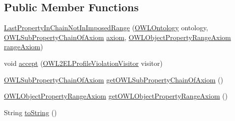 \subsection*{Public Member Functions}
\begin{DoxyCompactItemize}
\item 
\hyperlink{classorg_1_1semanticweb_1_1owlapi_1_1profiles_1_1_last_property_in_chain_not_in_imposed_range_afcbd6d82aa8f1a8db6fcac6af91a22f8}{Last\-Property\-In\-Chain\-Not\-In\-Imposed\-Range} (\hyperlink{interfaceorg_1_1semanticweb_1_1owlapi_1_1model_1_1_o_w_l_ontology}{O\-W\-L\-Ontology} ontology, \hyperlink{interfaceorg_1_1semanticweb_1_1owlapi_1_1model_1_1_o_w_l_sub_property_chain_of_axiom}{O\-W\-L\-Sub\-Property\-Chain\-Of\-Axiom} \hyperlink{classorg_1_1semanticweb_1_1owlapi_1_1profiles_1_1_last_property_in_chain_not_in_imposed_range_a111c0b3449dd5868fd68e55ca1378352}{axiom}, \hyperlink{interfaceorg_1_1semanticweb_1_1owlapi_1_1model_1_1_o_w_l_object_property_range_axiom}{O\-W\-L\-Object\-Property\-Range\-Axiom} \hyperlink{classorg_1_1semanticweb_1_1owlapi_1_1profiles_1_1_last_property_in_chain_not_in_imposed_range_a950663ea9305a01b3518d6cd85851512}{range\-Axiom})
\item 
void \hyperlink{classorg_1_1semanticweb_1_1owlapi_1_1profiles_1_1_last_property_in_chain_not_in_imposed_range_a0589795148c909d91e1b8cb9fca037f7}{accept} (\hyperlink{interfaceorg_1_1semanticweb_1_1owlapi_1_1profiles_1_1_o_w_l2_e_l_profile_violation_visitor}{O\-W\-L2\-E\-L\-Profile\-Violation\-Visitor} visitor)
\item 
\hyperlink{interfaceorg_1_1semanticweb_1_1owlapi_1_1model_1_1_o_w_l_sub_property_chain_of_axiom}{O\-W\-L\-Sub\-Property\-Chain\-Of\-Axiom} \hyperlink{classorg_1_1semanticweb_1_1owlapi_1_1profiles_1_1_last_property_in_chain_not_in_imposed_range_a42a1d8dd30e637c39dc907c94ca09503}{get\-O\-W\-L\-Sub\-Property\-Chain\-Of\-Axiom} ()
\item 
\hyperlink{interfaceorg_1_1semanticweb_1_1owlapi_1_1model_1_1_o_w_l_object_property_range_axiom}{O\-W\-L\-Object\-Property\-Range\-Axiom} \hyperlink{classorg_1_1semanticweb_1_1owlapi_1_1profiles_1_1_last_property_in_chain_not_in_imposed_range_a5014f740d3c8244fe740b1b1a09cb733}{get\-O\-W\-L\-Object\-Property\-Range\-Axiom} ()
\item 
String \hyperlink{classorg_1_1semanticweb_1_1owlapi_1_1profiles_1_1_last_property_in_chain_not_in_imposed_range_a1c4fe4b1d7608ca3a0f3dd38a4798656}{to\-String} ()
\end{DoxyCompactItemize}
